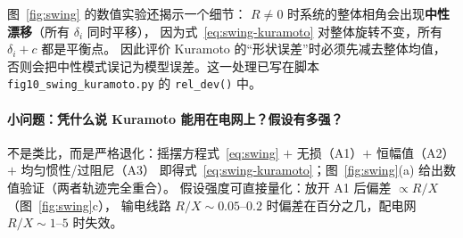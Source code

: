 图~\ref{fig:swing} 的数值实验还揭示一个细节：
$R\neq0$ 时系统的整体相角会出现\textbf{中性漂移}（所有 $\delta_i$ 同时平移），
因为式~\eqref{eq:swing-kuramoto} 对整体旋转不变，所有 $\delta_i+c$ 都是平衡点。
因此评价 Kuramoto 的“形状误差”时必须先减去整体均值，
否则会把中性模式误记为模型误差。这一处理已写在脚本 \texttt{fig10\_swing\_kuramoto.py}
的 \texttt{rel\_dev()} 中。

\paragraph{小问题：凭什么说 Kuramoto 能用在电网上？假设有多强？}
不是类比，而是严格退化：摇摆方程式~\eqref{eq:swing}
$+$ 无损（A1）$+$ 恒幅值（A2）$+$ 均匀惯性/过阻尼（A3）
即得式~\eqref{eq:swing-kuramoto}；图~\ref{fig:swing}(a) 给出数值验证（两者轨迹完全重合）。
假设强度可直接量化：放开 A1 后偏差 $\propto R/X$（图~\ref{fig:swing}c），
输电线路 $R/X\sim0.05$--$0.2$ 时偏差在百分之几，配电网 $R/X\sim1$--$5$ 时失效。


